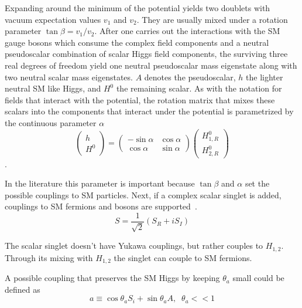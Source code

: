 Expanding around the minimum of the potential yields two doublets with vacuum expectation values $v_1$ and $v_2$. They are usually mixed under a rotation parameter $\tan \beta = v_1 / v_2$. After one carries out the interactions with the SM gauge bosons which consume the complex field components and a neutral pseudoscalar combination of scalar Higgs field components, the surviving three real degrees of freedom yield one neutral pseudoscalar mass eigenstate along with two neutral scalar mass eigenstates. $A$ denotes the pseudoscalar, $h$ the lighter neutral SM like Higgs, and $H^0$ the remaining scalar. As with the notation for fields that interact with the potential, the rotation matrix that mixes these scalars into the components that interact under the potential is parametrized by the continuous parameter $\alpha$ 
\begin{equation}
\begin{pmatrix} h \\ H^0\end{pmatrix} = \begin{pmatrix} -\sin\alpha & \cos\alpha \\ \cos\alpha & \sin\alpha \end{pmatrix}   \begin{pmatrix}H^0_{1,R} \\ H^0_{2,R}\end{pmatrix} 
\end{equation}.


In the literature this parameter is important because $\tan \beta$ and $\alpha$ set the possible couplings to SM particles. Next, if a complex scalar singlet is added, couplings to SM fermions and bosons are supported~\cite{Curtin_2014}.
\begin{equation}S = \frac{1}{\sqrt{2}}(S_R + iS_I)\end{equation}

The scalar singlet doesn't have Yukawa couplings, but rather couples to $H_{1,2}$. Through its mixing with $H_{1,2}$ the singlet can couple to SM fermions. 

A possible coupling that preserves the SM Higgs by keeping $\theta_a$ small could be defined as  
\begin{equation}a \equiv \cos \theta_a S_i + \sin \theta_a A ,\;\; \theta_a << 1 \end{equation}


